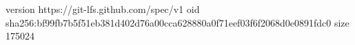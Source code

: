 version https://git-lfs.github.com/spec/v1
oid sha256:bf99fb7b5f51eb381d402d76a00cca628880a0f71eef03f6f2068d0e0891fdc0
size 175024
